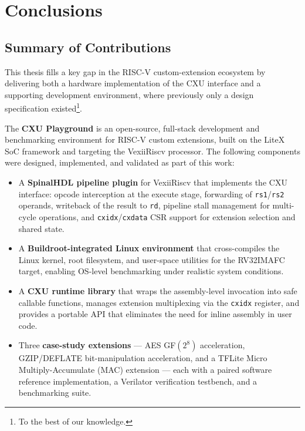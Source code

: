 \chapter{Conclusions}
\label{ch:conclusions}

\section{Summary of Contributions}
\label{sec:contributions_summary}

This thesis fills a key gap in the RISC-V custom-extension ecosystem by delivering both a hardware implementation of the CXU interface and a supporting development environment, where previously only a design specification existed\footnote{To the best of our knowledge.}.

The \textbf{CXU Playground} is an open-source, full-stack development and
benchmarking environment for RISC-V custom extensions, built on the LiteX SoC
framework and targeting the VexiiRiscv processor. The following components were
designed, implemented, and validated as part of this work:

\begin{itemize}
    \item A \textbf{SpinalHDL pipeline plugin} for VexiiRiscv that implements the
          CXU interface: opcode interception at the execute stage, forwarding of
          \texttt{rs1}/\texttt{rs2} operands, writeback of the result to \texttt{rd},
          pipeline stall management for multi-cycle operations, and
          \texttt{cxidx}/\texttt{cxdata} CSR support for extension selection and
          shared state.

    \item A \textbf{Buildroot-integrated Linux environment} that cross-compiles the
          Linux kernel, root filesystem, and user-space utilities for the RV32IMAFC
          target, enabling OS-level benchmarking under realistic system conditions.

    \item A \textbf{CXU runtime library} that wraps the assembly-level
          invocation into safe callable functions, manages extension multiplexing
          via the \texttt{cxidx} register, and provides a portable API that
          eliminates the need for inline assembly in user code.

    \item Three \textbf{case-study extensions} --- AES GF$(2^8)$ acceleration,
          GZIP/DEFLATE bit-manipulation acceleration, and a TFLite Micro
          Multiply-Accumulate (MAC) extension --- each with a paired software
          reference implementation, a Verilator verification testbench, and a
          benchmarking suite.
\end{itemize}

